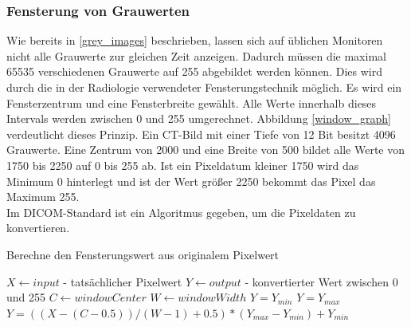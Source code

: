 \subsubsection{Fensterung von Grauwerten} \label{windowing}

Wie bereits in \ref{grey_images} beschrieben, lassen sich auf üblichen Monitoren nicht alle Grauwerte zur gleichen Zeit anzeigen. Dadurch müssen die maximal 65535 verschiedenen Grauwerte auf 255 abgebildet werden können. Dies wird durch die in der Radiologie verwendeter Fensterungstechnik möglich\cite[Kapitel 8, Seite 249]{handels:mbv}. Es wird ein Fensterzentrum und eine Fensterbreite gewählt. Alle Werte innerhalb dieses Intervals werden zwischen 0 und 255 umgerechnet. Abbildung \ref{window_graph} verdeutlicht dieses Prinzip. Ein CT-Bild mit einer Tiefe von 12 Bit besitzt 4096 Grauwerte. Eine Zentrum von 2000 und eine Breite von 500 bildet alle Werte von 1750 bis 2250 auf 0 bis 255 ab. Ist ein Pixeldatum kleiner 1750 wird das Minimum 0 hinterlegt und ist der Wert größer 2250 bekommt das Pixel das Maximum 255.\\
Im DICOM-Standard ist ein Algoritmus gegeben, um die Pixeldaten zu konvertieren\cite[C.11.2.1.2]{dicom:iod}.

\begin{algorithm}
\caption{Berechne den Fensterungswert aus originalem Pixelwert}
\begin{algorithmic}[1] 
\STATE $X \leftarrow input$ - tatsächlicher Pixelwert
\STATE $Y \leftarrow output$ - konvertierter Wert zwischen 0 und 255
\STATE $C \leftarrow windowCenter$
\STATE $W \leftarrow windowWidth$
	\STATE  $Y = Y_{min}$
	\STATE $Y = Y_{max}$
\ELSE
	\STATE $Y = ((X-(C-0.5)) / (W-1)+0.5)*(Y_{max}-Y_{min})+Y_{min}$
\ENDIF
\end{algorithmic}
\end{algorithm}


